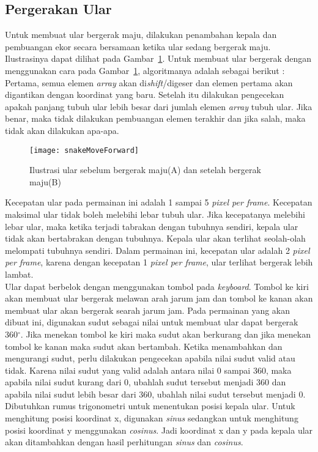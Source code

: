 \subsection{Pergerakan Ular}
Untuk membuat ular bergerak maju, dilakukan penambahan kepala dan pembuangan ekor secara bersamaan ketika ular sedang bergerak maju. Ilustrasinya dapat dilihat pada Gambar~\ref{fig:snakeMoveForward}. Untuk membuat ular bergerak dengan menggunakan cara pada Gambar~\ref{fig:snakeMoveForward}, algoritmanya adalah sebagai berikut : Pertama, semua elemen \textit{array} akan di\textit{shift}/digeser dan elemen pertama akan digantikan dengan koordinat yang baru. Setelah itu dilakukan pengecekan apakah panjang tubuh ular lebih besar dari jumlah elemen \textit{array} tubuh ular. Jika benar, maka tidak dilakukan pembuangan elemen terakhir dan jika salah, maka tidak akan dilakukan apa-apa. 

\begin{figure}[H]
	\centering  
	\texttt{[image: snakeMoveForward]}  
	\caption[Ilustrasi ular sebelum bergerak maju(A) dan setelah bergerak maju(B)]{Ilustrasi ular sebelum bergerak maju(A) dan setelah bergerak maju(B)}
	\label{fig:snakeMoveForward} 
\end{figure}

Kecepatan ular pada permainan ini adalah 1 sampai 5 \textit{pixel per frame}. Kecepatan maksimal ular tidak boleh melebihi lebar tubuh ular. Jika kecepatanya melebihi lebar ular, maka ketika terjadi tabrakan dengan tubuhnya sendiri, kepala ular tidak akan bertabrakan dengan tubuhnya. Kepala ular akan terlihat seolah-olah melompati tubuhnya sendiri. Dalam permainan ini, kecepatan ular adalah 2 \textit{pixel per frame}, karena dengan kecepatan 1 \textit{pixel per frame}, ular terlihat bergerak lebih lambat.\\

Ular dapat berbelok dengan menggunakan tombol pada \textit{keyboard}. Tombol ke kiri akan membuat ular bergerak melawan arah jarum jam dan tombol ke kanan akan membuat ular akan bergerak searah jarum jam. Pada permainan yang akan dibuat ini, digunakan sudut sebagai nilai untuk membuat ular dapat bergerak 360$^\circ$. Jika menekan tombol ke kiri maka sudut akan berkurang dan jika menekan tombol ke kanan maka sudut akan bertambah. Ketika menambahkan dan mengurangi sudut, perlu dilakukan pengecekan apabila nilai sudut valid atau tidak. Karena nilai sudut yang valid adalah antara nilai 0 sampai 360, maka apabila nilai sudut kurang dari 0, ubahlah sudut tersebut menjadi 360 dan apabila nilai sudut lebih besar dari 360, ubahlah nilai sudut tersebut menjadi 0. Dibutuhkan rumus trigonometri untuk menentukan posisi kepala ular. Untuk menghitung posisi koordinat x, digunakan \textit{sinus} sedangkan untuk menghitung posisi koordinat y menggunakan \textit{cosinus}. Jadi koordinat x dan y pada kepala ular akan ditambahkan dengan hasil perhitungan \textit{sinus} dan \textit{cosinus}.

